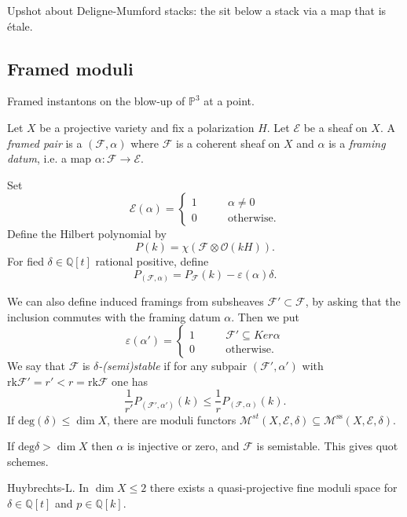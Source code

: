 \medskip\noindent
Upshot about Deligne-Mumford stacks:
the sit below a stack via a map that is étale.

\subsection{Framed moduli}
\label{subsection-framed-moduli}

\noindent
Framed instantons on the blow-up of $\mathbb{P}^3$ at a point.

Let $X$ be a projective variety and fix a polarization $H$.
Let $\mathcal{E}$ be a sheaf on $X$.
A {\it framed pair} is a $(\mathcal{F},\alpha)$ where
$\mathcal{F}$ is a coherent sheaf on $X$ 
and $\alpha$ is a {\it framing datum}, i.e.
a map $\alpha:\mathcal{F} \to \mathcal{E}$.

Set
$$
\mathcal{E}(\alpha)
=\begin{cases}
	1\qquad &\alpha\neq 0 \\
	0\qquad &\text{otherwise} .
\end{cases}
$$
Define the Hilbert polynomial by 
$$
P(k)=\chi(\mathcal{F} \otimes \mathcal{O}(kH)).
$$
For fied $\delta \in \mathbb{Q}[t]$ rational positive,
define
$$
P_{(\mathcal{F},\alpha)}=P_{\mathcal{F}}(k)-\varepsilon(\alpha)\delta.
$$

We can also define induced framings from subsheaves $\mathcal{F}' \subset
\mathcal{F}$, by asking that the inclusion commutes
with the framing datum $\alpha$.
Then we put
$$
\varepsilon(\alpha')
=\begin{cases}
	1\qquad &\mathcal{F}' \subseteq Ker \alpha \\
	0\qquad &\text{otherwise} .
\end{cases}
$$
We say that $\mathcal{F}$ is {\it $\delta$-(semi)stable}
if for any subpair $(\mathcal{F}',\alpha')$ with 
$\text{rk}\mathcal{F}'=r'<r=\text{rk}\mathcal{F}$
one has
$$
\frac{1}{r'}P_{(\mathcal{F}',\alpha')}(k)
\leq  \frac{1}{r}P_{(\mathcal{F},\alpha)}(k).
$$
If $\text{deg}(\delta)\leq \dim X$,
there are moduli functors $\mathcal{M}^{st}(X,\mathcal{E},\delta)
\subseteq \mathcal{M}^{\text{ss}}(X,\mathcal{E},\delta)$.

\begin{remark}
\label{remark-degree-greater-than-dimension}
If $\text{deg} \delta>\dim X$
then $\alpha$ is injective or zero, and $\mathcal{F}$ is semistable.
This gives quot schemes.
\end{remark}

\noindent
Huybrechts-L. In $\dim X\leq 2$
there exists a quasi-projective fine moduli space
for $\delta \in \mathbb{Q}[t]$ and $p \in \mathbb{Q}[k]$.

